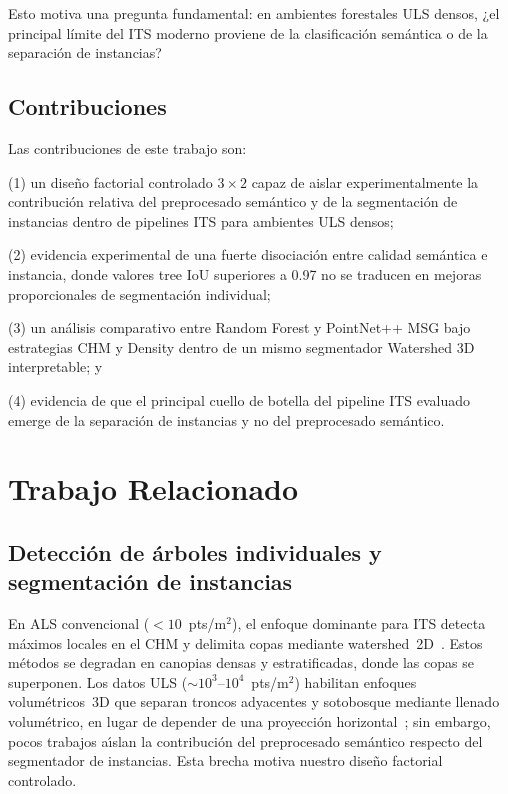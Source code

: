 \documentclass[runningheads]{llncs}
\begin{document}
Esto motiva una pregunta fundamental: en ambientes forestales ULS densos, ¿el principal límite del ITS moderno proviene de la clasificación semántica o de la separación de instancias?

\subsection{Contribuciones}

Las contribuciones de este trabajo son:

(1) un diseño factorial controlado $3 \times 2$ capaz de aislar experimentalmente la contribución relativa del preprocesado semántico y de la segmentación de instancias dentro de pipelines ITS para ambientes ULS densos;

(2) evidencia experimental de una fuerte disociación entre calidad semántica e instancia, donde valores tree IoU superiores a 0.97 no se traducen en mejoras proporcionales de segmentación individual;

(3) un análisis comparativo entre Random Forest y PointNet++ MSG bajo estrategias CHM y Density dentro de un mismo segmentador Watershed 3D interpretable; y

(4) evidencia de que el principal cuello de botella del pipeline ITS evaluado emerge de la separación de instancias y no del preprocesado semántico.


\section{Trabajo Relacionado}\label{sec:related}

\subsection{Detección de árboles individuales y segmentación de instancias}

En ALS convencional (${<}10$~pts/m$^2$), el enfoque dominante para ITS detecta m\'aximos locales en el CHM y delimita copas mediante watershed~2D~\cite{popescu2002,silva2016,dalponte2016}. Estos m\'etodos se degradan en canopias densas y estratificadas, donde las copas se superponen. Los datos ULS (${\sim}10^3$--$10^4$~pts/m$^2$) habilitan enfoques volum\'etricos~3D que separan troncos adyacentes y sotobosque mediante llenado volum\'etrico, en lugar de depender de una proyecci\'on horizontal~\cite{dalponte2016}; sin embargo, pocos trabajos a\'\i{}slan la contribuci\'on del preprocesado sem\'antico respecto del segmentador de instancias. Esta brecha motiva nuestro dise\~no factorial controlado.
\end{document}
